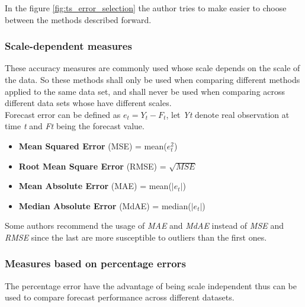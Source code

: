 In the figure \ref{fig:ts_error_selection} the author tries to make easier to
choose between the methods described forward.

\subsubsection{Scale-dependent measures}

These accuracy measures are commonly used whose scale depends on the scale of
the data. So these methods shall only be used when comparing different methods
applied to the same data set, and shall never be used when comparing across
different data sets whose have different scales.
\\

Forecast error can be defined as \begin{math} e_t = Y_t - F_t \end{math}, let
\emph{Yt} denote real observation at time \emph{t} and \emph{Ft} being the
forecast value.
\begin{itemize}
  \item \textbf{Mean Squared Error} (MSE) = mean(\begin{math} e_t^2 \end{math})
    \item \textbf{Root Mean Square Error} (RMSE) = \begin{math}
      \sqrt{MSE}\end{math}
  \item \textbf{Mean Absolute Error} (MAE) = mean(\begin{math}
      \left|e_t\right|\end{math})
  \item \textbf{Median Absolute Error} (MdAE) = median(\begin{math}
      \left|e_t\right|\end{math})

\end{itemize}

Some authors \cite{Armstrong:2001fj} recommend the usage of \emph{MAE} and
\emph{MdAE} instead of \emph{MSE} and \emph{RMSE} since the last are more
susceptible to outliers than the first ones.


\subsubsection{Measures based on percentage errors}

The percentage error have the advantage of being scale independent thus can be
used to compare forecast performance across different datasets.

